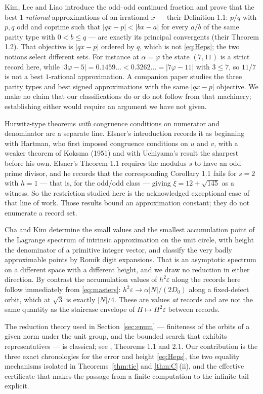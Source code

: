 \documentclass[11pt]{article}
\theoremstyle{definition}
\theoremstyle{remark}
\begin{document}
Kim, Lee and Liao \cite{KLL2022} introduce the odd--odd continued fraction and prove that the
best \emph{$1$-rational} approximations of an irrational $x$ --- their Definition 1.1: $p/q$
with $p,q$ odd and coprime such that $|qx-p|<|bx-a|$ for every $a/b$ of the same parity type
with $0<b\le q$ --- are exactly its principal convergents (their Theorem 1.2). That objective is
$|qx-p|$ ordered by $q$, which is not \eqref{eq:Heps}; the two notions select different sets.
For instance at $\alpha=\varphi$ the state $(7,11)$ is a strict record here, while
$|3\varphi-5|=0.1459\ldots<0.3262\ldots=|7\varphi-11|$ with $3\le7$, so $11/7$ is not a best
$1$-rational approximation. A companion paper \cite{KLL2025} studies the three parity types and
best signed approximations with the same $|qx-p|$ objective. We make no claim that our
classifications do or do not follow from that machinery; establishing either would require an
argument we have not given.

Hurwitz-type theorems \emph{with} congruence conditions on numerator and denominator are a
separate line. Elsner's introduction \cite{Elsner} records it as beginning with Hartman, who
first imposed congruence conditions on $u$ and $v$, with a weaker theorem of Koksma (1951) and
with Uchiyama's result the sharpest before his own. Elsner's Theorem 1.1 requires the modulus
$s$ to have an odd prime divisor, and he records that the corresponding Corollary 1.1 fails for
$s=2$ with $h=1$ --- that is, for the odd/odd class --- giving $\xi=12+\sqrt{145}$ as a
witness. So the restriction studied here is the acknowledged
exceptional case of that line of work. Those results bound an approximation constant; they do
not enumerate a record set.

Cha and Kim \cite{ChaKim} determine the small values and the smallest accumulation point of the
Lagrange spectrum of intrinsic approximation on the unit circle, with height the denominator of
a primitive integer vector, and classify the very badly approximable points by Romik digit
expansions. That is an asymptotic spectrum on a different space with a different height, and we
draw no reduction in either direction. By contrast the accumulation values of
$h^2\varepsilon$ along the records here follow immediately from \eqref{eq:masters}:
$h^2\varepsilon\to\alpha|N|/(2D_0)$ along a fixed-defect orbit, which at $\sqrt3$ is exactly
$|N|/4$. These are values \emph{at} records and are not the same quantity as the staircase
envelope of $H\mapsto H^2\varepsilon$ between records.

The reduction theory used in Section~\ref{sec:enum} --- finiteness of the orbits of a given norm
under the unit group, and the bounded search that exhibits representatives --- is classical; see
\cite{Conrad}, Theorems 1.1 and 2.1. Our contribution is the three exact chronologies for the error and height
\eqref{eq:Heps}, the two equality mechanisms isolated in Theorems~\ref{thm:tie} and
\ref{thm:C}\,(ii), and the effective certificate that makes the passage from a finite
computation to the infinite tail explicit.
\end{document}
